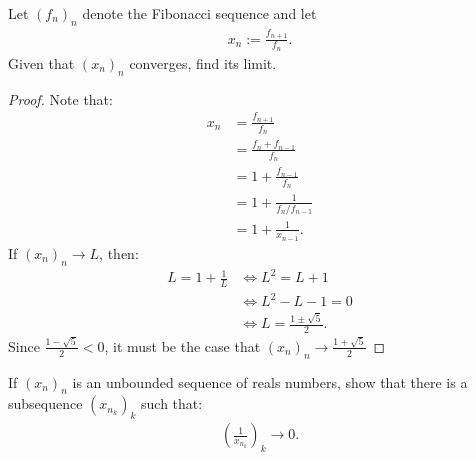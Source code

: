 \documentclass[10pt,twoside,openany]{memoir}
\begin{document}
    \begin{exercise}
        Let $(f_n)_n$ denote the Fibonacci sequence and let
            \begin{equation*}
            \begin{split}
                x_n := \frac{f_{n+1}}{f_n}.
            \end{split}
            \end{equation*}
        Given that $(x_n)_n$ converges, find its limit.
    \end{exercise}
        \begin{proof}
            Note that:
                \begin{equation*}
                \begin{split}
                    x_n 
                    &= \frac{f_{n+1}}{f_n} \\
                    &= \frac{f_{n} + f_{n-1}}{f_n} \\
                    &= 1 + \frac{f_{n-1}}{f_n} \\
                    & = 1 + \frac{1}{{f_n}/f_{n-1}} \\
                    & = 1 + \frac{1}{x_{n-1}}.
                \end{split}
                \end{equation*}
            If $(x_n)_n \rightarrow L$, then:
                \begin{equation*}
                \begin{split}
                    L = 1 + \frac{1}{L}
                    &\iff L^2 = L + 1 \\
                    &\iff L^2 - L - 1 = 0 \\
                    &\iff L = \frac{1 \pm \sqrt{5}}{2}.
                \end{split}
                \end{equation*}
            Since $\frac{1 - \sqrt{5}}{2} < 0$, it must be the case that $(x_n)_n \rightarrow \frac{1 + \sqrt{5}}{2}$
        \end{proof}
    \begin{exercise}
        If $(x_n)_n$ is an unbounded sequence of reals numbers, show that there is a subsequence $(x_{n_k})_k$ such that:
            \begin{equation*}
            \begin{split}
                \left(\frac{1}{x_{n_k}}\right)_k \rightarrow 0.
            \end{split}
            \end{equation*}
    \end{exercise}
\end{document}
